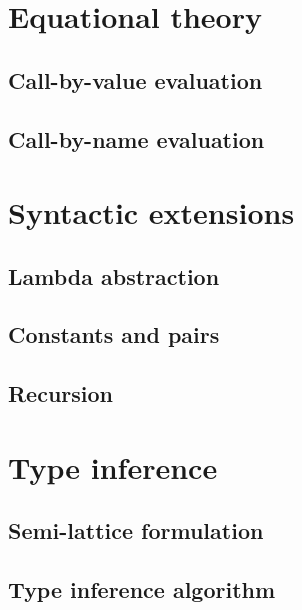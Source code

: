 
\section{Equational theory}
\label{sec:flat-syntax}

\subsection{Call-by-value evaluation}
\subsection{Call-by-name evaluation}


\section{Syntactic extensions}
\label{sec:flat-exts}

\subsection{Lambda abstraction}
\subsection{Constants and pairs}
\subsection{Recursion}


\section{Type inference}
\label{sec:flat-inference}

\subsection{Semi-lattice formulation}
\subsection{Type inference algorithm}

